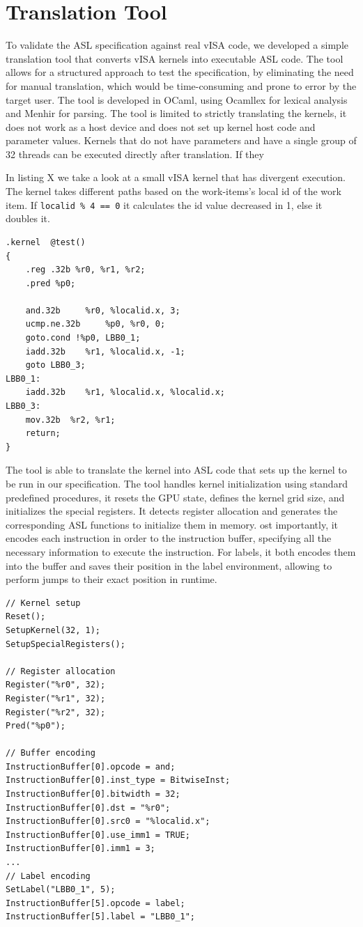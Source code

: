 \section{Translation Tool}
To validate the ASL specification against real vISA code, we developed a simple
translation tool that converts vISA kernels into executable ASL code. The tool
allows for a structured approach to test the specification, by eliminating the
need for manual translation, which would be time-consuming and prone to error
by the target user. The tool is developed in OCaml, using Ocamllex for lexical
analysis and Menhir for parsing. The tool is limited to strictly translating
the kernels, it does not work as a host device and does not set up kernel host
code and parameter values. Kernels that do not have parameters and have a
single group of 32 threads can be executed directly after translation. If they

In listing X we take a look at a small vISA kernel that has divergent
execution. The kernel takes different paths based on the work-items's local id
of the work item. If \lstinline{localid % 4 == 0} it calculates the id value
decreased in 1, else it doubles it.

\begin{lstlisting}
.kernel  @test()
{
    .reg .32b %r0, %r1, %r2;
	.pred %p0;
    
	and.32b 	%r0, %localid.x, 3;
	ucmp.ne.32b 	%p0, %r0, 0;
	goto.cond !%p0, LBB0_1;
	iadd.32b 	%r1, %localid.x, -1;
	goto LBB0_3;
LBB0_1:                                
	iadd.32b 	%r1, %localid.x, %localid.x;
LBB0_3:                                 
	mov.32b	 %r2, %r1;
	return;
}
\end{lstlisting}

The tool is able to translate the kernel into ASL code that sets up the kernel
to be run in our specification. The tool handles kernel initialization using
standard predefined procedures, it resets the GPU state, defines the kernel
grid size, and initializes the special registers. It detects register
allocation and generates the corresponding ASL functions to initialize them in
memory. ost importantly, it encodes each instruction in order to the
instruction buffer, specifying all the necessary information to execute the
instruction. For labels, it both encodes them into the buffer and saves their
position in the label environment, allowing to perform jumps to their exact
position in runtime.

\begin{lstlisting}
// Kernel setup
Reset();
SetupKernel(32, 1);
SetupSpecialRegisters();

// Register allocation
Register("%r0", 32);
Register("%r1", 32);
Register("%r2", 32);
Pred("%p0");

// Buffer encoding
InstructionBuffer[0].opcode = and;
InstructionBuffer[0].inst_type = BitwiseInst;
InstructionBuffer[0].bitwidth = 32;
InstructionBuffer[0].dst = "%r0";
InstructionBuffer[0].src0 = "%localid.x";
InstructionBuffer[0].use_imm1 = TRUE;
InstructionBuffer[0].imm1 = 3;
...
// Label encoding
SetLabel("LBB0_1", 5);
InstructionBuffer[5].opcode = label;
InstructionBuffer[5].label = "LBB0_1"; 
\end{lstlisting}

